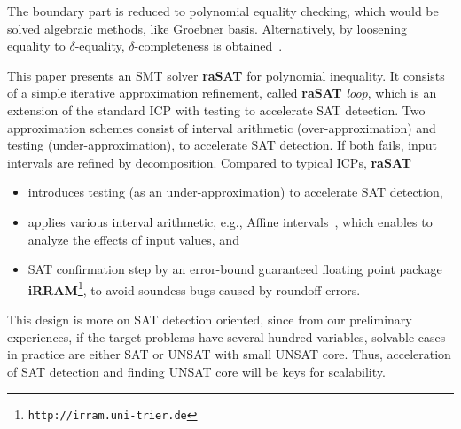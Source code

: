 The boundary part is reduced to polynomial equality checking, 
which would be solved algebraic methods, like Groebner basis. 
Alternatively, by loosening equality to $\delta$-equality, 
$\delta$-completeness is obtained~\cite{dRealIJCAR12,dRealLICS12}. 

This paper presents an SMT solver {\bf raSAT} for polynomial inequality. 
It consists of a simple iterative approximation refinement, called {\bf raSAT} {\em loop}, 
which is an extension of the standard ICP with testing to accelerate SAT detection. 
Two approximation schemes consist of interval arithmetic (over-approximation) and 
testing (under-approximation), to accelerate SAT detection. 
If both fails, input intervals are refined by decomposition. 
%
Compared to typical ICPs, {\bf raSAT} 
\begin{itemize}
\item introduces testing (as an under-approximation) to accelerate SAT detection, 
\item applies various interval arithmetic, e.g., Affine intervals~\cite{Stolfi03,ngocase,tapas12}, 
which enables to analyze the effects of input values, and 
\item SAT confirmation step by an error-bound guaranteed floating point package {\bf iRRAM}\footnote{%
\tt http://irram.uni-trier.de}, to avoid soundess bugs caused by roundoff errors. 
\end{itemize}
This design is more on SAT detection oriented, since from our preliminary experiences, 
if the target problems have several hundred variables, solvable cases in practice are 
either SAT or UNSAT with small UNSAT core. 
Thus, acceleration of SAT detection and finding UNSAT core will be keys for scalability. 

